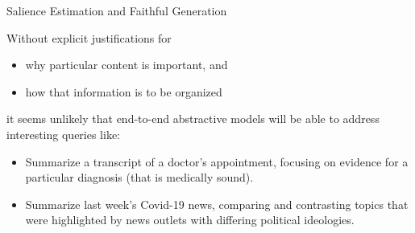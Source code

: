 \begin{frame}[t]{Salience Estimation and Faithful Generation}
\begin{itemize}
{\item Without explicit justifications for 
    \begin{itemize}
        \item  why particular content is important, and
        \item how that information is to be organized  
   \end{itemize}

      \vspace{10pt}
   \item it seems unlikely that end-to-end abstractive models will be able to address interesting queries like:

\begin{itemize}
  \item Summarize a transcript of a doctor's appointment, focusing on evidence
      for a particular diagnosis (that is medically sound).
  \item Summarize last week's Covid-19 news, comparing and contrasting topics
      that were highlighted by news outlets with differing political 
      ideologies.

 \end{itemize}
 \hfill
}
\end{itemize}

\end{frame}

